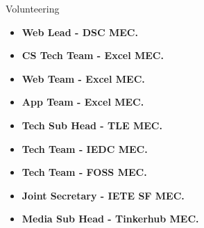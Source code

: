 \documentclass{resume} %
\begin{document}
	\begin{rSection}{Volunteering} 
		\begin{itemize}
			\item 	\textbf{ Web Lead - DSC MEC.}
				\item 	\textbf{ CS Tech Team - Excel MEC.}
			\item 	\textbf{ Web Team - Excel MEC.}
			\item 	\textbf{ App Team - Excel MEC.}
			
					\item 	\textbf{ Tech Sub Head - TLE MEC.}
						\item 	\textbf{ Tech Team - IEDC MEC.}
							\item 	\textbf{ Tech Team - FOSS MEC.}
								\item 	\textbf{ Joint Secretary - IETE SF MEC.}
								\item 	\textbf{ Media Sub Head - Tinkerhub MEC.}
								
		\end{itemize}
		
		
	\end{rSection}
	
	
	
\end{document}
